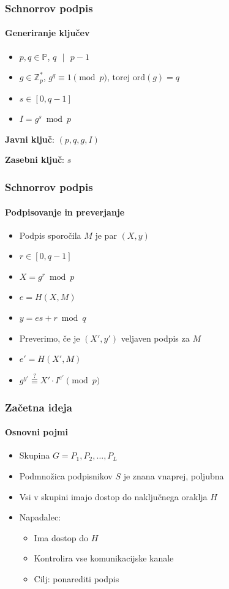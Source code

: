 \documentclass{beamer}    %
\begin{document}
\begin{frame}
    \frametitle{Schnorrov podpis}
    \framesubtitle{Generiranje ključev}
    \begin{itemize}
        \item $p, q \in \mathbb{P}$, $q\text{ }|\text{ }p-1$
        \item $g \in \mathbb{Z}_p^*$, $g^q \equiv 1 \pmod{p}$, torej $\text{ord}(g) = q$
        \item $s \in [0, q-1]$
        \item $I = g^s \bmod{p}$
    \end{itemize}
    \vspace{1cm}
    \begin{multicols*}{2}
        \textbf{Javni ključ}: $(p, q, g, I)$
        \columnbreak

        \textbf{Zasebni ključ}: $s$
    \end{multicols*}
\end{frame}

\begin{frame}
    \frametitle{Schnorrov podpis}
    \framesubtitle{Podpisovanje in preverjanje}
    \begin{itemize}
        \item Podpis sporočila $M$ je par $(X, y)$
        \item $r \in [0, q-1]$
        \item $X = g^r \bmod{p}$
        \item $e = H(X, M)$
        \item $y = es + r \bmod{q}$
    \end{itemize}
    
    \vspace{1cm}
    \begin{itemize}
        \item Preverimo, če je $(X', y')$ veljaven podpis za $M$
        \item $e' = H(X', M)$
        \item $g^{y'} \stackrel{?}{\equiv} X' \cdot I^{e'} \pmod{p}$
    \end{itemize}
\end{frame}

\begin{frame}
    \frametitle{Začetna ideja}
    \framesubtitle{Osnovni pojmi}
    \begin{itemize}
        \item Skupina $G = P_1, P_2, \dots, P_L$
        \item Podmnožica podpisnikov $S$ je znana vnaprej, poljubna
        \item Vsi v skupini imajo dostop do naključnega oraklja $H$
        \item Napadalec: 
            \begin{itemize}
                \item Ima dostop do $H$
                \item Kontrolira vse komunikacijske kanale
                \item Cilj: ponarediti podpis
            \end{itemize}
    \end{itemize}
\end{frame}
\end{document}

